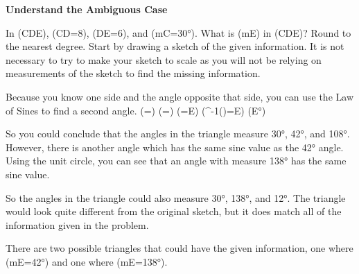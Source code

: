 \documentclass{article}
\newenvironment{example}[1]{}{}         %
\newcommand{\answer}[1]{}               %
\newcommand{\placeholder}[2]{}          %
\newcommand{\te}[1]{}                   %
\begin{document}
\begin{example}{3}
\textbf{Understand the Ambiguous Case}
\te{CONCEPTUAL UNDERSTANDING}
In (\triangle CDE), (CD=8), (DE=6), and (m\angle C=30°). What is (m\angle E) in (\triangle CDE)? Round to the nearest degree.
Start by drawing a sketch of the given information. It is not necessary to try to make your sketch to scale as you will not be relying on measurements of the sketch to find the missing information.
\placeholder{diagram}{Black triangle with E lower left, C lower right, D above and left of center. Red lengths ED 6, DC 8; angle C 30°.}
Because you know one side and the angle opposite that side, you can use the Law of Sines to find a second angle.
(=)
(=)
(=\sin E)
(\sin^{-1}()=\angle E)
(\angle E°)
\te{Callout: Substitute and then isolate the variable.}
So you could conclude that the angles in the triangle measure 30°, 42°, and 108°. However, there is another angle which has the same sine value as the 42° angle.
Using the unit circle, you can see that an angle with measure 138° has the same sine value.
\placeholder{graph}{Red unit circle on black double-arrowed x,y axes, O origin. Square grid spacing .25, window -1.5 to 1.5 on both axes; x labels -1,-0.5,0.5,1 and y labels -1,-0.5,1. Blue radii to filled blue quadrant I and II points at angles 42° and 138°. Green vertical segments to x axis labeled sin 42° and sin 138°. Red 42° arc and green 138° arc from positive x axis.}
\te{LOOK FOR RELATIONSHIPS If a triangle has one obtuse angle given, there is only one possible triangle. If one acute angle is given, then two triangles may be possible. CONTINUED ON THE NEXT PAGE.}
So the angles in the triangle could also measure 30°, 138°, and 12°. The triangle would look quite different from the original sketch, but it does match all of the information given in the problem.
\placeholder{diagram}{Triangle EDC with horizontal base E left C right, D above left; ED 6, DC 8 solid, angle C 30°. Dashed DE' from D to E' on base near C; obtuse angle at E' 138°. Original E labeled E; new base point labeled E.}
There are two possible triangles that could have the given information, one where (m\angle E=42°) and one where (m\angle E=138°).
\te{STUDY TIP Regardless of what information a problem is asking for or how it is being solved, do not rely on the appearance of an angle to guide your answers. Always work measurements out mathematically.}
\answer{(m\angle E=42°) or (m\angle E=138°).}
\end{example}
\end{document}
